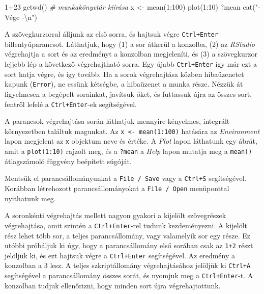 \documentclass[
]{book}
\newenvironment{Shaded}{\begin{snugshade}}{\end{snugshade}}
\newcommand{\CommentTok}[1]{\textcolor[rgb]{0.56,0.35,0.01}{\textit{#1}}}
\newcommand{\DecValTok}[1]{\textcolor[rgb]{0.00,0.00,0.81}{#1}}
\newcommand{\FunctionTok}[1]{\textcolor[rgb]{0.00,0.00,0.00}{#1}}
\newcommand{\NormalTok}[1]{#1}
\newcommand{\OtherTok}[1]{\textcolor[rgb]{0.56,0.35,0.01}{#1}}
\newcommand{\SpecialCharTok}[1]{\textcolor[rgb]{0.00,0.00,0.00}{#1}}
\newcommand{\StringTok}[1]{\textcolor[rgb]{0.31,0.60,0.02}{#1}}
\begin{document}
\begin{Shaded}
\begin{Highlighting}[]
\DecValTok{1}\SpecialCharTok{+}\DecValTok{23}
\FunctionTok{getwd}\NormalTok{()          }\CommentTok{\# munkakönyvtár kiírása}
\NormalTok{x }\OtherTok{\textless{}{-}} \FunctionTok{mean}\NormalTok{(}\DecValTok{1}\SpecialCharTok{:}\DecValTok{100}\NormalTok{)}
\FunctionTok{plot}\NormalTok{(}\DecValTok{1}\SpecialCharTok{:}\DecValTok{10}\NormalTok{)}
\NormalTok{?mean}
\FunctionTok{cat}\NormalTok{(}\StringTok{"{-} Vége {-}}\SpecialCharTok{\textbackslash{}n}\StringTok{"}\NormalTok{)}
\end{Highlighting}
\end{Shaded}

A szövegkurzorral álljunk az első sorra, és hajtsuk végre \texttt{Ctrl+Enter} billentyűparancsot. Láthatjuk, hogy (1) a sor átkerül a konzolba, (2) az \emph{RStudio} végrehajtja a sort és az eredményt a konzolban megjeleníti, és (3) a szövegkurzor lejjebb lép a következő végrehajtható sorra. Egy újabb \texttt{Ctrl+Enter} így már ezt a sort hatja végre, és így tovább. Ha a sorok végrehajtása közben hibaüzenetet kapunk (\texttt{Error}), ne essünk kétségbe, a hibaüzenet a munka része. Nézzük át figyelmesen a begépelt sorainkat, javítsuk őket, és futtassuk újra az összes sort, fentről lefelé a \texttt{Ctrl+Enter}-ek segítségével.

A parancsok végrehajtása során láthatjuk mennyire kényelmes, integrált környezetben találtuk magunkat. Az \texttt{x\ \textless{}-\ mean(1:100)} hatására az \emph{Environment} lapon megjelent az \texttt{x} objektum neve és értéke. A \emph{Plot} lapon láthatunk egy ábrát, amit a \texttt{plot(1:10)} rajzolt meg, és a \texttt{?mean} a \emph{Help} lapon mutatja meg a \texttt{mean()} átlagszámoló függvény beépített súgóját.

Mentsük el parancsállományunkat a \texttt{File\ /\ Save} vagy a \texttt{Ctrl+S} segítségével. Korábban létrehozott parancsállományokat a \texttt{File\ /\ Open} menüponttal nyithatunk meg.

A soronkénti végrehajtás mellett nagyon gyakori a kijelölt szövegrészek végrehajtása, amit szintén a \texttt{Ctrl+Enter}-rel tudunk kezdeményezni. A kijelölt rész lehet több sor, a teljes parancsállomány, vagy valamelyik sor egy része. Ez utóbbi próbáljuk ki úgy, hogy a parancsállomány első sorában csak az \texttt{1+2} részt jelöljük ki, és ezt hajtsuk végre a \texttt{Ctrl+Enter} segítségével. Az eredmény a konzolban a 3 lesz. A teljes szkriptállomány végrehajtásához jelöljük ki \texttt{Ctrl+A} segítségével a parancsállomány összes sorát, és nyomjuk meg a \texttt{Ctrl+Enter}-t. A konzolban tudjuk ellenőrizni, hogy minden sort újra végrehajtottunk.
\end{document}
